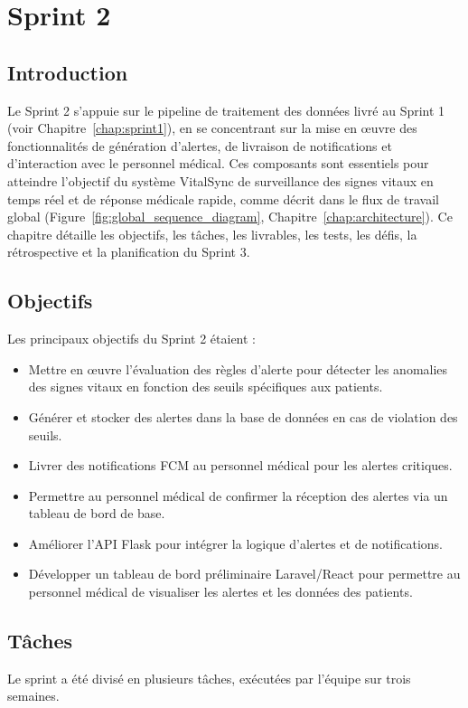 \chapter{Sprint 2}
\label{chap:sprint2}

\section*{Introduction}
Le Sprint 2 s'appuie sur le pipeline de traitement des données livré au Sprint 1 (voir Chapitre~\ref{chap:sprint1}), en se concentrant sur la mise en \oe uvre des fonctionnalités de génération d'alertes, de livraison de notifications et d'interaction avec le personnel médical. Ces composants sont essentiels pour atteindre l'objectif du système VitalSync de surveillance des signes vitaux en temps réel et de réponse médicale rapide, comme décrit dans le flux de travail global (Figure~\ref{fig:global_sequence_diagram}, Chapitre~\ref{chap:architecture}). Ce chapitre détaille les objectifs, les tâches, les livrables, les tests, les défis, la rétrospective et la planification du Sprint 3.

\section{Objectifs}
Les principaux objectifs du Sprint 2 étaient :
\begin{itemize}
    \item Mettre en \oe uvre l'évaluation des règles d'alerte pour détecter les anomalies des signes vitaux en fonction des seuils spécifiques aux patients.
    \item Générer et stocker des alertes dans la base de données en cas de violation des seuils.
    \item Livrer des notifications FCM au personnel médical pour les alertes critiques.
    \item Permettre au personnel médical de confirmer la réception des alertes via un tableau de bord de base.
    \item Améliorer l'API Flask pour intégrer la logique d'alertes et de notifications.
    \item Développer un tableau de bord préliminaire Laravel/React pour permettre au personnel médical de visualiser les alertes et les données des patients.
\end{itemize}

\section{Tâches}
Le sprint a été divisé en plusieurs tâches, exécutées par l'équipe sur trois semaines.

